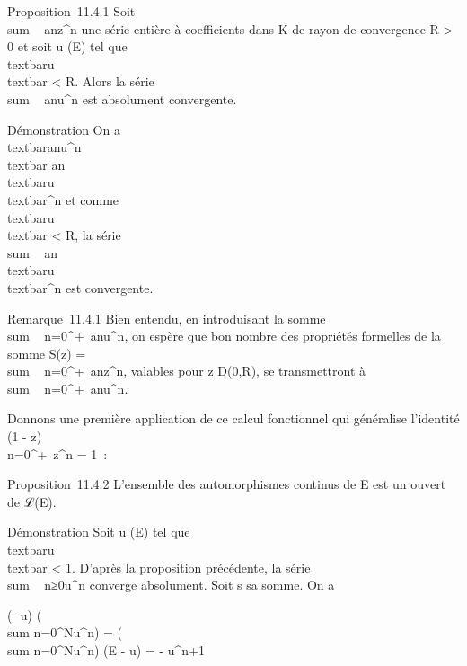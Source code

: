 Proposition~11.4.1 Soit
\\sum ~
anz^n une série entière à coefficients dans K de
rayon de convergence R \textgreater{} 0 et soit u (E) tel que
\\textbar{}u\\textbar{} \textless{} R.
Alors la série \\sum ~
anu^n est absolument convergente.

Démonstration On a
\\textbar{}anu^n\\textbar{}
\leq\textbar{}an\textbar{}\,\\textbar{}u\\textbar{}^n
et comme \\textbar{}u\\textbar{}
\textless{} R, la série
\\sum ~
\textbar{}an\textbar{}\,\\textbar{}u\\textbar{}^n
est convergente.

Remarque~11.4.1 Bien entendu, en introduisant la somme
\\sum ~
n=0^+\infty~anu^n, on espère que bon
nombre des propriétés formelles de la somme S(z)
= \\sum ~
n=0^+\infty~anz^n, valables pour z \in
D(0,R), se transmettront à
\\sum ~
n=0^+\infty~anu^n.

Donnons une première application de ce calcul fonctionnel qui généralise
l'identité (1 - z)\\\sum
 n=0^+\infty~z^n = 1~:

Proposition~11.4.2 L'ensemble des automorphismes continus de E est un
ouvert de ℒ(E).

Démonstration Soit u (E) tel que
\\textbar{}u\\textbar{} \textless{} 1.
D'après la proposition précédente, la série
\\sum ~
n≥0u^n converge absolument. Soit s sa somme. On a

(\mathrmIdE - u) \cdot\left
(\\sum
n=0^Nu^n\right ) =
\left (\\sum
n=0^Nu^n\right ) \cdot
(\mathrmId E - u) =
\mathrmIdE - u^n+1

